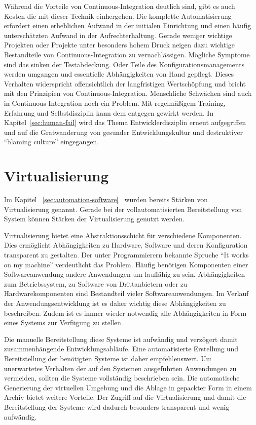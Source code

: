 Während die Vorteile von Continuous-Integration deutlich sind, gibt es auch Kosten die mit dieser Technik einhergehen. 
Die komplette Automatisierung erfordert einen erheblichen Aufwand in der initialen Einrichtung und einen häufig 
unterschätzten Aufwand in der Aufrechterhaltung. Gerade weniger wichtige Projekten oder Projekte unter besonders hohem 
Druck neigen dazu wichtige Bestandteile von Continuous-Integration zu vernachlässigen. Mögliche Symptome sind das sinken 
der Testabdeckung. Oder Teile des Konfigurationsmanagements werden umgangen und essentielle Abhängigkeiten von Hand 
gepflegt. Dieses Verhalten widerspricht offensichtlich der langfristigen Wertschöpfung und bricht mit den Prinzipien von 
Continuous-Integration. Menschliche Schwächen sind auch in Continuous-Integration noch ein Problem. Mit regelmäßigem 
Training, Erfahrung und Selbstdisziplin kann dem entgegen gewirkt werden. In Kapitel~\ref{sec:human-fail} wird das Thema 
Entwicklerdisziplin erneut aufgegriffen und auf die Gratwanderung von gesunder Entwicklungskultur und destruktiver 
``blaming culture'' eingegangen.

\section{Virtualisierung}

Im Kapitel ~\ref{sec:automation-software}~ wurden bereits Stärken von Virtualisierung 
genannt. Gerade bei der vollautomatisierten Bereitstellung von System können Stärken der Virtualisierung genutzt werden.

Virtualisierung bietet eine Abstraktionsschicht für verschiedene Komponenten. Dies ermöglicht Abhängigkeiten zu Hardware, 
Software und deren Konfiguration transparent zu gestalten. Der unter Programmierern bekannte Spruche ``It works on my 
machine'' verdeutlicht das Problem. Häufig benötigen Komponenten einer Softwareanwendung andere Anwendungen um lauffähig 
zu sein. Abhängigkeiten zum Betriebssystem, zu Software von Drittanbietern oder zu Hardwarekomponenten sind Bestandteil 
vieler Softwareanwendungen. Im Verlauf der Anwendungsentwicklung ist es daher wichtig diese Abhängigkeiten zu 
beschreiben. Zudem ist es immer wieder notwendig alle Abhängigkeiten in Form eines Systems zur Verfügung zu stellen.

Die manuelle Bereitstellung diese Systeme ist aufwändig und verzögert damit zusammenhängende Entwicklungsabläufe. Eine 
automatisierte Erstellung und Bereitstellung der benötigten Systeme ist daher empfehlenswert. Um unerwartetes Verhalten 
der auf den Systemen ausgeführten Anwendungen zu vermeiden, sollten die Systeme vollständig beschrieben sein. Die 
automatische Generierung der virtuellen Umgebung und die Ablage in gepackter Form in einem Archiv bietet weitere 
Vorteile. Der Zugriff auf die Virtualisierung und damit die Bereitstellung der Systeme wird dadurch besonders transparent 
und wenig aufwändig.


